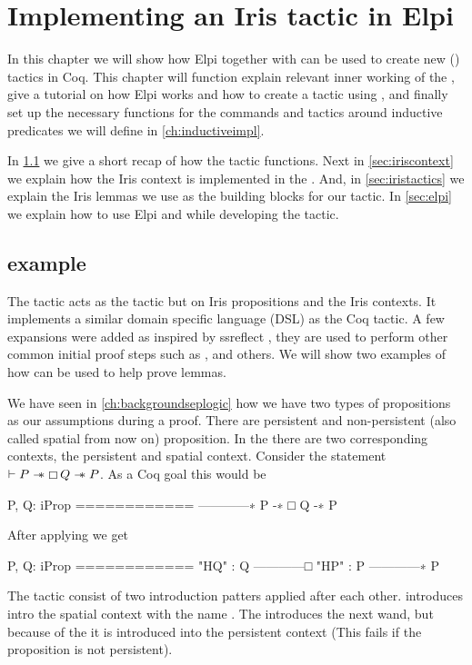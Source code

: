 \documentclass[thesis.tex]{subfiles}
\begin{document}
\VerbatimFootnotes

\chapter{Implementing an Iris tactic in Elpi}
In this chapter we will show how Elpi together with \ce can be used to create new (\IPM) tactics in Coq.
This chapter will function explain relevant inner working of the \IPM, give a tutorial on how Elpi works and how to create a tactic using \ce, and finally set up the necessary functions for the commands and tactics around inductive predicates we will define in \cref{ch:inductiveimpl}.

In \cref{sec:introsex} we give a short recap of how the  tactic functions. Next in \cref{sec:iriscontext} we explain how the Iris context is implemented in the \IPM. And, in \cref{sec:iristactics} we explain the Iris lemmas we use as the building blocks for our tactic. In \cref{sec:elpi} we explain how to use Elpi and \ce while developing the  tactic.


\section[iIntros example]{ example}\label{sec:introsex}
The \IPM {} tactic acts as the  tactic but on Iris propositions and the Iris contexts. It implements a similar domain specific language (DSL) as the Coq tactic. A few expansions were added as inspired by ssreflect \cite*{huetCoqProofAssistant1997, gonthierSmallScaleReflection2016}, they are used to perform other common initial proof steps such as ,  and others. We will show two examples of how  can be used to help prove lemmas.

We have seen in \cref{ch:backgroundseplogic} how we have two types of propositions as our assumptions during a proof. There are persistent and non-persistent (also called spatial from now on) proposition.
In the \IPM there are two corresponding contexts, the persistent and spatial context. Consider the statement $\vdash P \mathrel{-\!\!\ast} \mathop{\boxempty}Q \mathrel{-\!\!\ast} P$. As a Coq goal this would be
\begin{coqcode}
  P, Q: iProp
  ============
  ------------∗
  P -∗ □ Q -∗ P
\end{coqcode}
After applying  we get
\begin{coqcode}
  P, Q: iProp
  ============
  "HQ" : Q
  ------------□
  "HP" : P
  ------------∗
  P
\end{coqcode}
The tactic  consist of two introduction patters applied after each other.  introduces  intro the spatial context with the name . The  introduces the next wand, but because of the \coqi{#} it is introduced into the persistent context (This fails if the proposition is not persistent).
\end{document}
